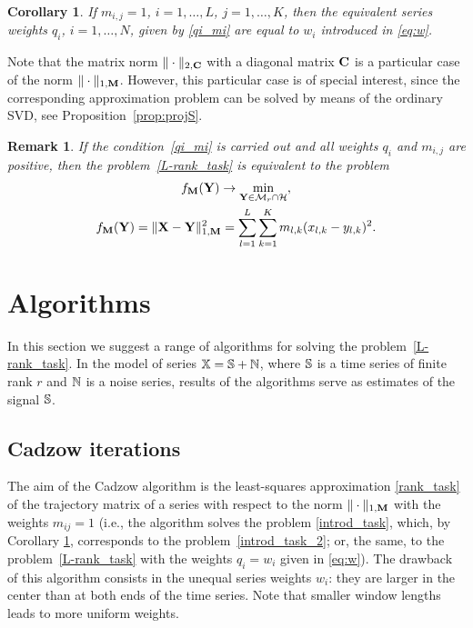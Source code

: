 \documentclass[sii]{ipart}
\newtheorem{corollary}{Corollary}
\newtheorem{remark}{Remark}
\begin{document}
\begin{corollary}
	\label{cor:base_weights}
	If $m_{i,j}=1$, $i =1, \ldots, L$, $j = 1, \ldots, K$, then the equivalent series weights $q_i$, $i = 1, \ldots, N$, given by \eqref{qi_mi} are equal to $w_i$ introduced in \eqref{eq:w}.
\end{corollary}

Note that the matrix norm $\|\cdot\|_{2, \mathbf{C}}$ with a diagonal matrix $\mathbf{C}$ is a particular case of the norm $\|\cdot\|_{1, \mathbf{M}}$.
However, this particular case is of special interest, since the corresponding approximation problem can be solved by means of the ordinary SVD, see Proposition~\ref{prop:projS}.

\begin{remark}
	\label{rem:2tasks}
	If the condition~\eqref{qi_mi} is carried out and all weights $q_i$ and $m_{i,j}$ are positive, then the problem~\eqref{L-rank_task}
	is equivalent to the problem
	\begin{multline}
	\label{rank_task}
	f_\bfM(\bfY) \to \min_{\bfY \in \calM_r \cap \calH}, \\ f_\bfM(\bfY) = \|\bfX-\bfY\|^2_{1,\bfM} = \sum_{l = 1}^L \sum_{k=1}^K m_{l,k} (x_{l,k} - y_{l,k})^2.
	\end{multline}
\end{remark}

\section{Algorithms}
\label{sec:alg}
In this section we suggest a range of algorithms for solving the problem~\eqref{L-rank_task}.
In the model of series $\mathbb{X}=\mathbb{S}+\mathbb{N}$, where $\mathbb{S}$ is a time series of finite rank $r$ and $\mathbb{N}$ is a noise series, results of the algorithms serve as  estimates of the signal $\mathbb{S}$.

\subsection{Cadzow iterations}
The aim of the Cadzow algorithm \cite{Cadzow1988} is the least-squares approximation \eqref{rank_task} of the trajectory matrix of a series with respect to the norm $\|\cdot\|_{1, \mathbf{M}}$ with the weights $m_{ij}=1$ (i.e., the algorithm solves the problem \eqref{introd_task}, which, by Corollary \ref{cor:base_weights}, corresponds to the problem~\eqref{introd_task_2}; or, the same, to the problem~\eqref{L-rank_task} with the weights $q_i=w_i$ given in \eqref{eq:w}). The drawback of this algorithm consists in the unequal series weights $w_i$: they are larger in the center than at both ends of the time series. Note that smaller window lengths leads to more uniform weights.
\end{document}
